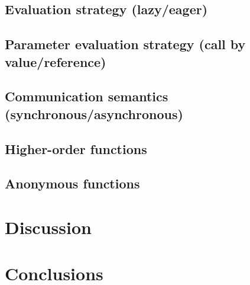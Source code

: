 \documentclass{uva-inf-article}
\begin{document}
\subsection{Evaluation strategy (lazy/eager)}
\subsection{Parameter evaluation strategy (call by value/reference)}
\subsection{Communication semantics (synchronous/asynchronous)}
\subsection{Higher-order functions}
\subsection{Anonymous functions}

\section{Discussion}

\section{Conclusions}


\printbibliography


\end{document}
